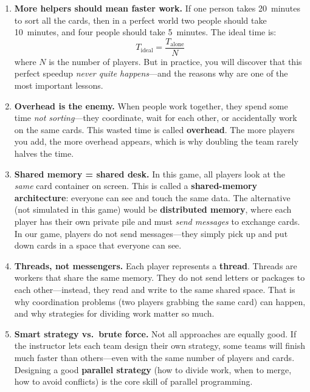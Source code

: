 \begin{enumerate}
    \item \textbf{More helpers should mean faster work.} If one person takes 20~minutes to sort all the cards, then in a perfect world two people should take 10~minutes, and four people should take 5~minutes. The ideal time is:
          \[
              T_{\text{ideal}} = \frac{T_{\text{alone}}}{N}
          \]
          where $N$ is the number of players. But in practice, you will discover that this perfect speedup \emph{never quite happens}---and the reasons why are one of the most important lessons.

    \item \textbf{Overhead is the enemy.} When people work together, they spend some time \emph{not sorting}---they coordinate, wait for each other, or accidentally work on the same cards. This wasted time is called \textbf{overhead}. The more players you add, the more overhead appears, which is why doubling the team rarely halves the time.

    \item \textbf{Shared memory = shared desk.} In this game, all players look at the \emph{same} card container on screen. This is called a \textbf{shared-memory architecture}: everyone can see and touch the same data. The alternative (not simulated in this game) would be \textbf{distributed memory}, where each player has their own private pile and must \emph{send messages} to exchange cards. In our game, players do not send messages---they simply pick up and put down cards in a space that everyone can see.

    \item \textbf{Threads, not messengers.} Each player represents a \textbf{thread}. Threads are workers that share the same memory. They do not send letters or packages to each other---instead, they read and write to the same shared space. That is why coordination problems (two players grabbing the same card) can happen, and why strategies for dividing work matter so much.

    \item \textbf{Smart strategy vs.\ brute force.} Not all approaches are equally good. If the instructor lets each team design their own strategy, some teams will finish much faster than others---even with the same number of players and cards. Designing a good \textbf{parallel strategy} (how to divide work, when to merge, how to avoid conflicts) is the core skill of parallel programming.
\end{enumerate}

